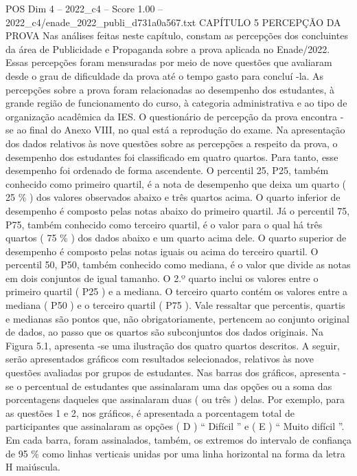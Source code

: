 \begin{textsample}{POS Dim 4 – 2022\_c4 – Score 1.00 – 2022\_c4/enade\_2022\_publi\_d731a0a567.txt}  \label{ex:f4_pos_150}
CAPÍTULO 5 PERCEPÇÃO DA PROVA Nas análises feitas neste capítulo, constam as percepções dos concluintes da área de Publicidade e Propaganda sobre a prova aplicada no Enade/2022.
Essas percepções foram mensuradas por meio de nove questões que avaliaram desde o grau de dificuldade da prova até o tempo gasto para concluí -la.
As percepções sobre a prova foram relacionadas ao desempenho dos estudantes, à grande região de funcionamento do curso, à categoria administrativa e ao tipo de organização acadêmica da IES.
O questionário de percepção da prova encontra -se ao final do Anexo VIII, no qual está a reprodução do exame.
Na apresentação dos dados relativos às nove questões sobre as percepções a respeito da prova, o desempenho dos estudantes foi classificado em quatro quartos.
Para tanto, esse desempenho foi ordenado de forma ascendente.
O percentil 25, P25, também conhecido como primeiro quartil, é a nota de desempenho que deixa um quarto ( 25 \% ) dos valores observados abaixo e três quartos acima.
O quarto inferior de desempenho é composto pelas notas abaixo do primeiro quartil.
Já o percentil 75, P75, também conhecido como terceiro quartil, é o valor para o qual há três quartos ( 75 \% ) dos dados abaixo e um quarto acima dele.
O quarto superior de desempenho é composto pelas notas iguais ou acima do terceiro quartil.
O percentil 50, P50, também conhecido como mediana, é o valor que divide as notas em dois conjuntos de igual tamanho.
O 2.º quarto inclui os valores entre o primeiro quartil ( P25 ) e a mediana.
O terceiro quarto contém os valores entre a mediana ( P50 ) e o terceiro quartil ( P75 ).
Vale ressaltar que percentis, quartis e medianas são pontos que, não obrigatoriamente, pertencem ao conjunto original de dados, ao passo que os quartos são subconjuntos dos dados originais.
Na Figura 5.1, apresenta -se uma ilustração dos quatro quartos descritos.
A seguir, serão apresentados gráficos com resultados selecionados, relativos às nove questões avaliadas por grupos de estudantes.
Nas barras dos gráficos, apresenta -se o percentual de estudantes que assinalaram uma das opções ou a soma das porcentagens daqueles que assinalaram duas ( ou três ) delas.
Por exemplo, para as questões 1 e 2, nos gráficos, é apresentada a porcentagem total de participantes que assinalaram as opções ( D ) “ Difícil ” e ( E ) “ Muito difícil ”.
Em cada barra, foram assinalados, também, os extremos do intervalo de confiança de 95 \% como linhas verticais unidas por uma linha horizontal na forma da letra H maiúscula.

\end{textsample}
